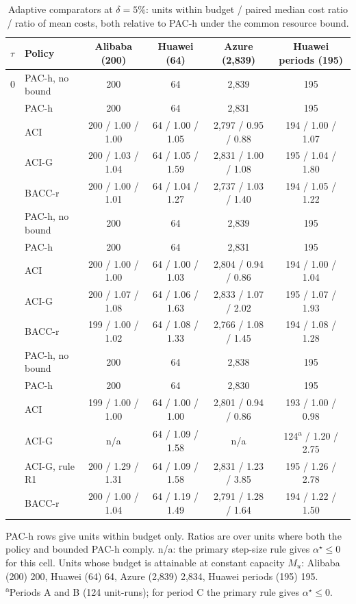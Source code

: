 \begin{table}[!htbp]\centering\footnotesize\setlength{\tabcolsep}{4pt}
\caption{Adaptive comparators at $\delta=5\%$: units within budget / paired median cost ratio / ratio of mean costs, both relative to PAC-h under the common resource bound.}
\label{tab:adaptive_grid_5}
\begin{tabular}{@{}llcccc@{}}\toprule
$\tau$ & Policy & Alibaba (200) & Huawei (64) & Azure (2,839) & Huawei periods (195) \\ \midrule
0 & PAC-h, no bound & 200 & 64 & 2,839 & 195 \\
 & PAC-h & 200 & 64 & 2,831 & 195 \\
 & ACI & 200 / 1.00 / 1.00 & 64 / 1.00 / 1.05 & 2,797 / 0.95 / 0.88 & 194 / 1.00 / 1.07 \\
 & ACI-G & 200 / 1.03 / 1.04 & 64 / 1.05 / 1.59 & 2,831 / 1.00 / 1.08 & 195 / 1.04 / 1.80 \\
 & BACC-r & 200 / 1.00 / 1.01 & 64 / 1.04 / 1.27 & 2,737 / 1.03 / 1.40 & 194 / 1.05 / 1.22 \\
\addlinespace
1 & PAC-h, no bound & 200 & 64 & 2,839 & 195 \\
 & PAC-h & 200 & 64 & 2,831 & 195 \\
 & ACI & 200 / 1.00 / 1.00 & 64 / 1.00 / 1.03 & 2,804 / 0.94 / 0.86 & 194 / 1.00 / 1.04 \\
 & ACI-G & 200 / 1.07 / 1.08 & 64 / 1.06 / 1.63 & 2,833 / 1.07 / 2.02 & 195 / 1.07 / 1.93 \\
 & BACC-r & 199 / 1.00 / 1.02 & 64 / 1.08 / 1.33 & 2,766 / 1.08 / 1.45 & 194 / 1.08 / 1.28 \\
\addlinespace
5 & PAC-h, no bound & 200 & 64 & 2,838 & 195 \\
 & PAC-h & 200 & 64 & 2,830 & 195 \\
 & ACI & 199 / 1.00 / 1.00 & 64 / 1.00 / 1.00 & 2,801 / 0.94 / 0.86 & 193 / 1.00 / 0.98 \\
 & ACI-G & n/a & 64 / 1.09 / 1.58 & n/a & 124\textsuperscript{a} / 1.20 / 2.75 \\
 & ACI-G, rule R1 & 200 / 1.29 / 1.31 & 64 / 1.09 / 1.58 & 2,831 / 1.23 / 3.85 & 195 / 1.26 / 2.78 \\
 & BACC-r & 200 / 1.00 / 1.04 & 64 / 1.19 / 1.49 & 2,791 / 1.28 / 1.64 & 194 / 1.22 / 1.50 \\
\bottomrule
\end{tabular}\par\vspace{3pt}
\begin{minipage}{\textwidth}\footnotesize\raggedright PAC-h rows give units within budget only. Ratios are over units where both the policy and bounded PAC-h comply. n/a: the primary step-size rule gives $\alpha^\star\le0$ for this cell. Units whose budget is attainable at constant capacity $M_u$: Alibaba (200) 200, Huawei (64) 64, Azure (2,839) 2,834, Huawei periods (195) 195. \textsuperscript{a}Periods A and B (124 unit-runs); for period C the primary rule gives $\alpha^\star\le0$.\end{minipage}
\end{table}

